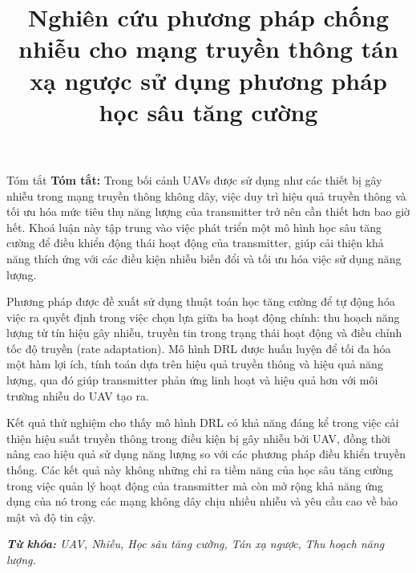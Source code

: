 \documentclass{uetgraduation}
\begin{document}
\title{Nghiên cứu phương pháp chống nhiễu cho mạng truyền thông tán xạ ngược sử dụng phương pháp học sâu tăng cường}
\makecovers
\begin{preamble}{Tóm tắt}
\textbf{Tóm tắt:} Trong bối cảnh UAVs được sử dụng như các thiết bị gây nhiễu trong mạng truyền thông không dây, 
việc duy trì hiệu quả truyền thông và tối ưu hóa mức tiêu thụ năng lượng của transmitter trở nên cần thiết hơn 
bao giờ hết. Khoá luận này tập trung vào việc phát triển một mô hình học sâu tăng cường để điều khiển động thái 
hoạt động của transmitter, giúp cải thiện khả năng thích ứng với các điều kiện nhiễu biến đổi và tối ưu hóa việc 
sử dụng năng lượng.

Phương pháp được đề xuất sử dụng thuật toán học tăng cường để tự động hóa việc ra quyết định trong việc chọn lựa 
giữa ba hoạt động chính: thu hoạch năng lượng từ tín hiệu gây nhiễu, truyền tin trong trạng thái hoạt động và điều 
chỉnh tốc độ truyền (rate adaptation). Mô hình DRL được huấn luyện để tối đa hóa một hàm lợi ích, tính toán dựa trên 
hiệu quả truyền thông và hiệu quả năng lượng, qua đó giúp transmitter phản ứng linh hoạt và hiệu quả hơn với môi trường 
nhiễu do UAV tạo ra.

Kết quả thử nghiệm cho thấy mô hình DRL có khả năng đáng kể trong việc cải thiện hiệu suất truyền thông trong điều kiện 
bị gây nhiễu bởi UAV, đồng thời nâng cao hiệu quả sử dụng năng lượng so với các phương pháp điều khiển truyền thống. Các 
kết quả này không những chỉ ra tiềm năng của học sâu tăng cường trong việc quản lý hoạt động của transmitter mà còn mở 
rộng khả năng ứng dụng của nó trong các mạng không dây chịu nhiều nhiễu và yêu cầu cao về bảo mật và độ tin cậy.

\textit{\textbf{Từ khóa:} UAV, Nhiễu, Học sâu tăng cường, Tán xạ ngược, Thu hoạch năng lượng.}
\end{preamble}
\end{document}
